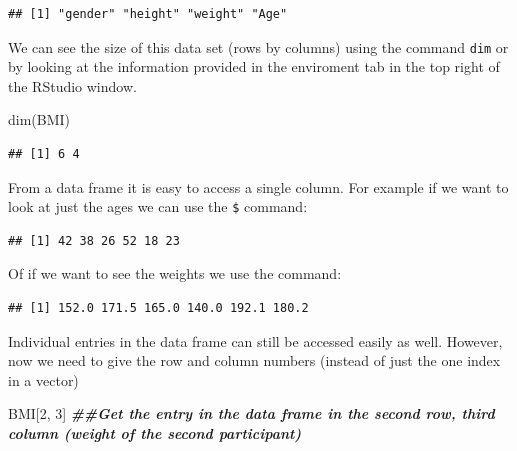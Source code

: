 \documentclass[
]{book}
\newenvironment{Shaded}{\begin{snugshade}}{\end{snugshade}}
\newcommand{\DecValTok}[1]{\textcolor[rgb]{0.00,0.00,0.81}{#1}}
\newcommand{\DocumentationTok}[1]{\textcolor[rgb]{0.56,0.35,0.01}{\textbf{\textit{#1}}}}
\newcommand{\FunctionTok}[1]{\textcolor[rgb]{0.00,0.00,0.00}{#1}}
\newcommand{\NormalTok}[1]{#1}
\newcommand{\SpecialCharTok}[1]{\textcolor[rgb]{0.00,0.00,0.00}{#1}}
\theoremstyle{definition}
\theoremstyle{definition}
\theoremstyle{definition}
\theoremstyle{definition}
\theoremstyle{remark}
\begin{document}
\begin{verbatim}
## [1] "gender" "height" "weight" "Age"
\end{verbatim}

We can see the size of this data set (rows by columns) using the command \texttt{dim} or by looking at the information provided in the enviroment tab in the top right of the RStudio window.

\begin{Shaded}
\begin{Highlighting}[]
\FunctionTok{dim}\NormalTok{(BMI)}
\end{Highlighting}
\end{Shaded}

\begin{verbatim}
## [1] 6 4
\end{verbatim}

From a data frame it is easy to access a single column. For example if we want to look at just the ages we can use the \texttt{\$} command:

\begin{Shaded}
\end{Shaded}

\begin{verbatim}
## [1] 42 38 26 52 18 23
\end{verbatim}

Of if we want to see the weights we use the command:

\begin{Shaded}
\end{Shaded}

\begin{verbatim}
## [1] 152.0 171.5 165.0 140.0 192.1 180.2
\end{verbatim}

Individual entries in the data frame can still be accessed easily as well. However, now we need to give the row and column numbers (instead of just the one index in a vector)

\begin{Shaded}
\begin{Highlighting}[]
\NormalTok{BMI[}\DecValTok{2}\NormalTok{, }\DecValTok{3}\NormalTok{]  }\DocumentationTok{\#\#Get the entry in the data frame in the second row, third column (weight of the second participant)}
\end{Highlighting}
\end{Shaded}
\end{document}

